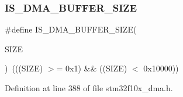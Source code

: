 \subsubsection{\texorpdfstring{I\+S\+\_\+\+D\+M\+A\+\_\+\+B\+U\+F\+F\+E\+R\+\_\+\+S\+I\+ZE}{IS\_DMA\_BUFFER\_SIZE}}
{\footnotesize\ttfamily \#define I\+S\+\_\+\+D\+M\+A\+\_\+\+B\+U\+F\+F\+E\+R\+\_\+\+S\+I\+ZE(\begin{DoxyParamCaption}\item[{}]{S\+I\+ZE }\end{DoxyParamCaption})~(((S\+I\+ZE) $>$= 0x1) \&\& ((\+S\+I\+Z\+E) $<$ 0x10000))}



Definition at line 388 of file stm32f10x\+\_\+dma.\+h.

